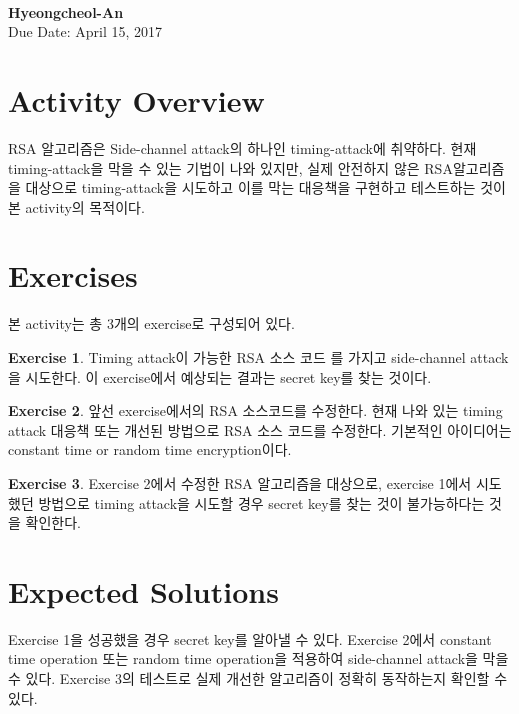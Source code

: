 \documentclass[a4paper, 11pt]{article}
\theoremstyle{definition}
\newtheorem{exercise}{Exercise}
\begin{document}
 \\
         {\phantom{} \hfill \textbf{Hyeongcheol-An}} \\
         {\phantom{} \hfill Due Date: April 15, 2017} \\

\section{Activity Overview}

RSA 알고리즘은 Side-channel attack의 하나인 timing-attack에 취약하다. 현재 timing-attack을 막을 수 있는 기법이 나와 있지만, 실제 안전하지 않은 RSA알고리즘을 대상으로 timing-attack을 시도하고 이를 막는 대응책을 구현하고 테스트하는 것이 본 activity의 목적이다.

\section{Exercises}

본 activity는 총 3개의 exercise로 구성되어 있다.

\begin{exercise}

  Timing attack이 가능한 RSA 소스 코드 \cite{RSAsourcecode} 를 가지고 side-channel attack을 시도한다. 이 exercise에서 예상되는 결과는 secret key를 찾는 것이다.

\end{exercise}

\begin{exercise}

  앞선 exercise에서의 RSA 소스코드를 수정한다. 현재 나와 있는 timing attack 대응책 또는 개선된 방법으로 RSA 소스 코드를 수정한다. 기본적인 아이디어는 constant time or random time encryption이다.

\end{exercise}

\begin{exercise}

  Exercise 2에서 수정한 RSA 알고리즘을 대상으로, exercise 1에서 시도했던 방법으로 timing attack을 시도할 경우 secret key를 찾는 것이 불가능하다는 것을 확인한다.

\end{exercise}

\section{Expected Solutions}

Exercise 1을 성공했을 경우 secret key를 알아낼 수 있다. Exercise 2에서 constant time operation 또는 random time operation을 적용하여 side-channel attack을 막을 수 있다. Exercise 3의 테스트로 실제 개선한 알고리즘이 정확히 동작하는지 확인할 수 있다.





\end{document}
